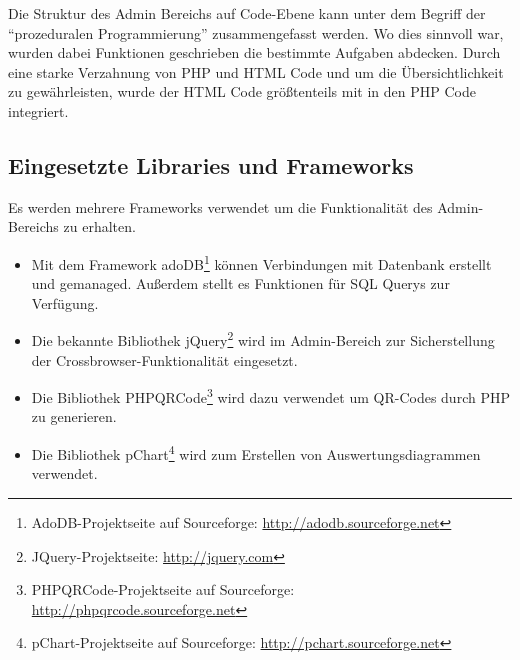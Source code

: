 Die Struktur des Admin Bereichs auf Code-Ebene kann unter dem Begriff der
"`prozeduralen Programmierung"' zusammengefasst werden. Wo dies sinnvoll war, wurden dabei
Funktionen geschrieben die bestimmte Aufgaben abdecken. Durch eine starke
Verzahnung von \gls{PHP} und \gls{HTML} Code und um die Übersichtlichkeit zu gewährleisten, wurde
der \gls{HTML} Code größtenteils mit in den \gls{PHP} Code integriert.


\subsection{Eingesetzte Libraries und Frameworks}
Es werden mehrere Frameworks verwendet um die Funktionalität des Admin-Bereichs
zu erhalten.
\begin{singlespacing}
	\begin{itemize}
	  	\item Mit dem Framework \gls{adoDB}\footnote{AdoDB-Projektseite auf Sourceforge: \url{http://adodb.sourceforge.net}} können Verbindungen mit Datenbank erstellt und gemanaged. Außerdem
			stellt es Funktionen für \gls{SQL} Querys zur Verfügung.
		\item Die bekannte Bibliothek \gls{jQuery}\footnote{JQuery-Projektseite: \url{http://jquery.com}} wird im Admin-Bereich zur Sicherstellung der Crossbrowser-Funktionalität eingesetzt.
		\item Die Bibliothek \gls{PHPQRCode}\footnote{PHPQRCode-Projektseite auf Sourceforge: \url{http://phpqrcode.sourceforge.net}} wird dazu verwendet um QR-Codes durch \gls{PHP} zu
			generieren.
		\item Die Bibliothek \gls{pChart}\footnote{pChart-Projektseite auf Sourceforge: \url{http://pchart.sourceforge.net}} wird zum Erstellen von Auswertungsdiagrammen verwendet.
	\end{itemize}
\end{singlespacing}
 


